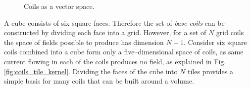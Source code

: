\begin{figure}
  \centering
  \quad
  \caption{Coils as a vector space.}
\end{figure}

A cube consists of six square faces. Therefore the set of \emph{base coils} can be constructed by dividing each face into a grid. However, for a set of $N$ grid coils the space of fields possible to produce has dimension $N-1$. Consider six square coils combined into a cube form only a five--dimensional space of coils, as same current flowing in each of the coils produces no field, as explained in Fig.\,\ref{fig:coils_tile_kernel}. Dividing the faces of the cube into $N$ tiles provides a simple basis for many coils that can be built around a volume.


